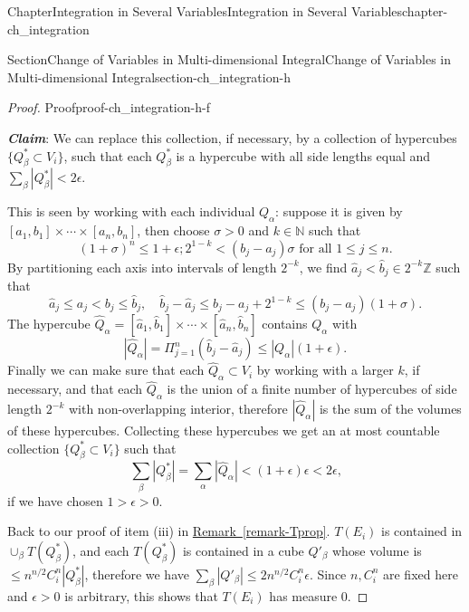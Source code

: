 \documentclass[oneside,10pt,]{book}
\newcommand{\xreffont}{\relax}
\newcommand{\alert}[1]{\textbf{\textit{#1}}}
\numberwithin{equation}{section}
\newcommand{\bbN}{\mathbb{N}}
\newcommand{\bbZ}{\mathbb{Z}}
\newcommand{\lt}{<}
\begin{document}
\begin{chapterptx}{Chapter}{Integration in Several Variables}{}{Integration in Several Variables}{}{}{chapter-ch_integration}
\begin{sectionptx}{Section}{Change of Variables in Multi-dimensional Integral}{}{Change of Variables in Multi-dimensional Integral}{}{}{section-ch_integration-h}
\begin{proof}{Proof}{}{proof-ch_integration-h-f}
\par
\alert{Claim}: We can replace this collection, if necessary, by a collection of hypercubes \(\{ Q^*_{\beta}\subset V_{i}\}\), such that each \(Q^*_{\beta}\) is a hypercube with all side lengths equal and \(\sum_{\beta} | Q^*_{\beta}| \lt 2\epsilon\).%
\par
This is seen by working with each individual \(Q_{\alpha}\): suppose it is given by \([a_{1},b_{1}]\times\cdots \times [a_{n},b_{n}]\), then choose \(\sigma >0\) and \(k\in \bbN\) such that%
\begin{equation*}
(1+\sigma)^{n} \le 1+\epsilon; 2^{1-k} \lt (b_{j}-a_{j})\sigma \text{ for all $1\le j \le n$.}
\end{equation*}
By partitioning each axis into intervals of length \(2^{-k}\), we find \(\hat a_{j}\lt \hat b_{j} \in 2^{-k}\bbZ\) such that%
\begin{equation*}
\hat a_{j}\le a_{j}\lt b_{j}\le \hat b_{j}, \quad \hat b_{j}-\hat a_{j}\le b_{j}-a_{j} +2^{1-k}
\le ( b_{j}-a_{j})(1+\sigma).
\end{equation*}
The hypercube \(\hat Q_{\alpha}=[\hat a_1, \hat b_{1}]\times \cdots \times [\hat a_{n}, \hat b_{n}]\) contains \(Q_{\alpha}\) with%
\begin{equation*}
|\hat Q_{\alpha}|=\Pi_{j=1}^{n}(\hat b_{j}-\hat a_{j})\le |Q_{\alpha}|(1+\epsilon).
\end{equation*}
Finally we can make sure that each \(\hat Q_{\alpha}\subset V_{i}\) by working with a larger \(k\), if necessary, and that each \(\hat Q_{\alpha}\) is the union of a finite number of hypercubes of side length \(2^{-k}\) with non-overlapping  interior, therefore \(|\hat Q_{\alpha}|\) is the sum of the volumes of these hypercubes. Collecting these hypercubes we get an at most countable collection \(\{ Q^*_{\beta}\subset V_{i}\}\) such that%
\begin{equation*}
\sum_{\beta} | Q^*_{\beta}| = \sum_{\alpha}|\hat Q_{\alpha}| \lt (1+\epsilon)\epsilon \lt 2\epsilon\text{,}
\end{equation*}
if we have chosen \(1>\epsilon>0\).%
\par
Back to our proof of item (iii)  in \hyperref[remark-Tprop]{Remark~{\xreffont\ref{remark-Tprop}}}. \(T(E_{i})\) is contained in \(\cup_{\beta} T(Q^{*}_{\beta})\), and each \(T(Q^{*}_{\beta})\) is contained in a cube \(Q'_{\beta}\) whose volume is \(\le n^{n/2}C_{i}^{n} |Q^{*}_{\beta}|\), therefore we have \(\sum_{\beta}|Q'_{\beta}| \le 2n^{n/2}C_{i}^{n} \epsilon\). Since \(n, C_{i}^{n}\) are fixed here and \(\epsilon >0\) is arbitrary, this shows that \(T(E_{i})\) has measure \(0\).%

\end{proof}
\end{sectionptx}
\end{chapterptx}
\end{document}
